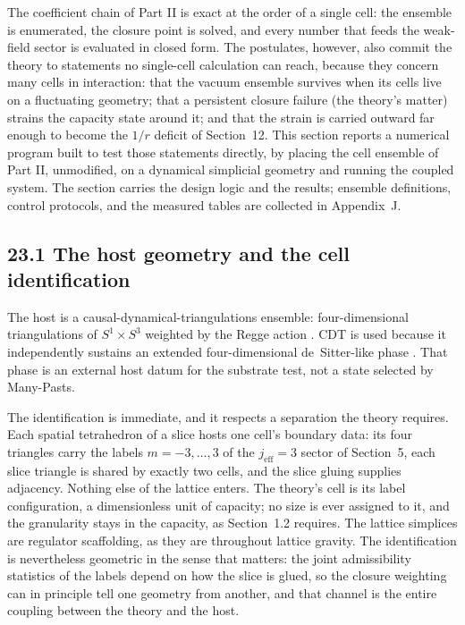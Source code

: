 \documentclass[11pt]{article}
\begin{document}
The coefficient chain of Part II is exact at the order of a single cell: the ensemble is enumerated, the closure point is solved, and every number that feeds the weak-field sector is evaluated in closed form. The postulates, however, also commit the theory to statements no single-cell calculation can reach, because they concern many cells in interaction: that the vacuum ensemble survives when its cells live on a fluctuating geometry; that a persistent closure failure (the theory's matter) strains the capacity state around it; and that the strain is carried outward far enough to become the $1/r$ deficit of Section~12. This section reports a numerical program built to test those statements directly, by placing the cell ensemble of Part II, unmodified, on a dynamical simplicial geometry and running the coupled system. The section carries the design logic and the results; ensemble definitions, control protocols, and the measured tables are collected in Appendix~J.

\subsection{23.1 The host geometry and the cell identification}

The host is a causal-dynamical-triangulations ensemble: four-dimensional triangulations of $S^1\times S^3$ weighted by the Regge action \citep{Regge1961}. CDT is used because it independently sustains an extended four-dimensional de~Sitter-like phase \citep{AmbjornJurkiewiczLoll2004,AmbjornGJL2012}. That phase is an external host datum for the substrate test, not a state selected by Many-Pasts.

The identification is immediate, and it respects a separation the theory requires. Each spatial tetrahedron of a slice hosts one cell's boundary data: its four triangles carry the labels $m=-3,\ldots,3$ of the $j_{\mathrm{eff}}=3$ sector of Section~5, each slice triangle is shared by exactly two cells, and the slice gluing supplies adjacency. Nothing else of the lattice enters. The theory's cell is its label configuration, a dimensionless unit of capacity; no size is ever assigned to it, and the granularity stays in the capacity, as Section~1.2 requires. The lattice simplices are regulator scaffolding, as they are throughout lattice gravity. The identification is nevertheless geometric in the sense that matters: the joint admissibility statistics of the labels depend on how the slice is glued, so the closure weighting can in principle tell one geometry from another, and that channel is the entire coupling between the theory and the host.
\end{document}
